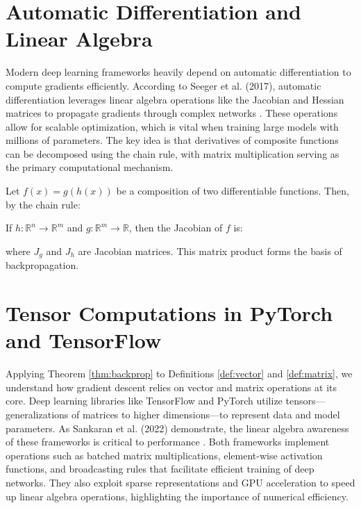 \documentclass{article}
\begin{document}

\section{Automatic Differentiation and Linear Algebra}
Modern deep learning frameworks heavily depend on automatic differentiation to compute gradients efficiently. According to Seeger et al. (2017), automatic differentiation leverages linear algebra operations like the Jacobian and Hessian matrices to propagate gradients through complex networks \cite{seeger2017auto}. These operations allow for scalable optimization, which is vital when training large models with millions of parameters. The key idea is that derivatives of composite functions can be decomposed using the chain rule, with matrix multiplication serving as the primary computational mechanism.

\begin{theorem}\label{thm:backprop}
    Let $f(x) = g(h(x))$ be a composition of two differentiable functions. Then, by the chain rule:

If $h : \mathbb{R}^n \to \mathbb{R}^m$ and $g : \mathbb{R}^m \to \mathbb{R}$, then the Jacobian of $f$ is:

where $J_g$ and $J_h$ are Jacobian matrices. This matrix product forms the basis of backpropagation.
\end{theorem} 


\section{Tensor Computations in PyTorch and TensorFlow}
Applying Theorem \ref{thm:backprop} to Definitions \ref{def:vector} and \ref{def:matrix}, we understand how gradient descent relies on vector and matrix operations at its core. Deep learning libraries like TensorFlow and PyTorch utilize tensors—generalizations of matrices to higher dimensions—to represent data and model parameters. As Sankaran et al. (2022) demonstrate, the linear algebra awareness of these frameworks is critical to performance \cite{sankaran2022benchmarking}. Both frameworks implement operations such as batched matrix multiplications, element-wise activation functions, and broadcasting rules that facilitate efficient training of deep networks. They also exploit sparse representations and GPU acceleration to speed up linear algebra operations, highlighting the importance of numerical efficiency.
\end{document}
